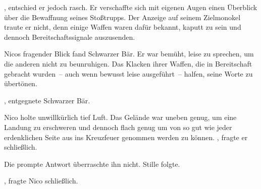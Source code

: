 \par

, entschied er jedoch rasch.  Er verschaffte sich mit eigenen Augen einen Überblick über die Bewaffnung seines Stoßtrupps. Der Anzeige auf seinem Zielmonokel traute er nicht, denn einige Waffen waren dafür bekannt, kaputt zu sein und dennoch Bereitschaftssignale auszusenden.

\par


\par

Nicos fragender Blick fand Schwarzer Bär.  Er war bemüht, leise zu sprechen, um die anderen nicht zu beunruhigen. Das Klacken ihrer Waffen, die in Bereitschaft gebracht wurden~-- auch wenn bewusst leise ausgeführt~-- halfen, seine Worte zu übertönen.

\par

, entgegnete Schwarzer Bär. 

\par

Nico holte unwillkürlich tief Luft. Das Gelände war uneben genug, um eine Landung zu erschweren und dennoch flach genug um von so gut wie jeder erdenklichen Seite aus ins Kreuzfeuer genommen werden zu können. , fragte er schließlich.

\par

Die prompte Antwort überraschte ihn nicht.  Stille folgte.

\par

, fragte Nico schließlich.

\par

